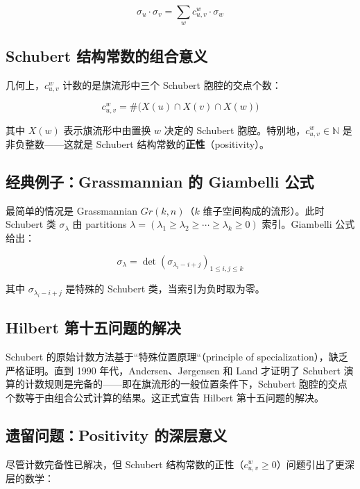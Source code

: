 \begin{equation}
\sigma_u \cdot \sigma_v = \sum_{w} c^w_{u,v} \cdot \sigma_w
\end{equation}

\subsection{Schubert 结构常数的组合意义}

几何上，$c^w_{u,v}$ 计数的是旗流形中三个 Schubert 胞腔的交点个数：

\begin{equation}
c^w_{u,v} = \# \big( X(u) \cap X(v) \cap X(w) \big)
\end{equation}

其中 $X(w)$ 表示旗流形中由置换 $w$ 决定的 Schubert 胞腔。特别地，$c^w_{u,v} \in \mathbb{N}$ 是非负整数——这就是 Schubert 结构常数的\textbf{正性}（positivity）。
\subsection{经典例子：Grassmannian 的 Giambelli 公式}

最简单的情况是 Grassmannian $Gr(k, n)$（$k$ 维子空间构成的流形）。此时 Schubert 类 $\sigma_\lambda$ 由 partitions $\lambda = (\lambda_1 \geq \lambda_2 \geq \cdots \geq \lambda_k \geq 0)$ 索引。Giambelli 公式给出：

\begin{equation}
\sigma_\lambda = \det\left( \sigma_{\lambda_i - i + j} \right)_{1 \leq i, j \leq k}
\end{equation}

其中 $\sigma_{\lambda_i - i + j}$ 是特殊的 Schubert 类，当索引为负时取为零。
\subsection{Hilbert 第十五问题的解决}

Schubert 的原始计数方法基于``特殊位置原理``（principle of specialization），缺乏严格证明。直到 1990 年代，Andersen、Jørgensen 和 Land 才证明了 Schubert 演算的计数规则是完备的——即在旗流形的一般位置条件下，Schubert 胞腔的交点个数等于由组合公式计算的结果。这正式宣告 Hilbert 第十五问题的解决。

\subsection{遗留问题：Positivity 的深层意义}

尽管计数完备性已解决，但 Schubert 结构常数的正性（$c^w_{u,v} \geq 0$）问题引出了更深层的数学：

